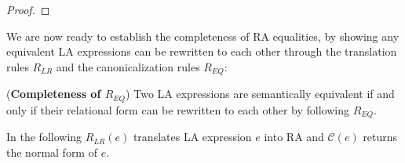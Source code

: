 \begin{proof}
% 
% 
% 
\end{proof}{}

We are now ready to establish the completeness of RA equalities, by
showing any equivalent LA expressions can be rewritten to each other
through the translation rules $R_{LR}$ and the canonicalization rules
$R_{EQ}$:

\begin{thm} (\textbf{Completeness of $R_{EQ}$}) Two LA expressions
  are semantically equivalent if and only if their relational form can be rewritten to each other by following $R_{EQ}$. 
\end{thm}
In the following $R_{LR}(e)$ translates LA expression $e$ into RA and $\mathcal{C}(e)$ returns the normal form of $e$. 

